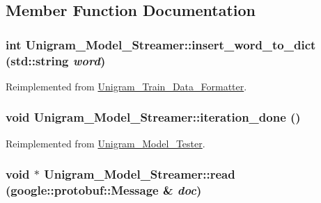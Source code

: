 \subsection{Member Function Documentation}
\hypertarget{class_unigram___model___streamer_a51a09e569da02b64cec4a551cc4f3ba0}{
\subsubsection[{insert\_\-word\_\-to\_\-dict}]{\setlength{\rightskip}{0pt plus 5cm}int Unigram\_\-Model\_\-Streamer::insert\_\-word\_\-to\_\-dict (std::string {\em word})}}
\label{class_unigram___model___streamer_a51a09e569da02b64cec4a551cc4f3ba0}


Reimplemented from \hyperlink{class_unigram___train___data___formatter_a0023886209f7fd1441a256238c86844a}{Unigram\_\-Train\_\-Data\_\-Formatter}.

\hypertarget{class_unigram___model___streamer_a60124013b5da9fabc486558801fa3ab4}{
\subsubsection[{iteration\_\-done}]{\setlength{\rightskip}{0pt plus 5cm}void Unigram\_\-Model\_\-Streamer::iteration\_\-done ()}}
\label{class_unigram___model___streamer_a60124013b5da9fabc486558801fa3ab4}


Reimplemented from \hyperlink{class_unigram___model___tester_a04021ed578bfeaa08a8956fc611c2722}{Unigram\_\-Model\_\-Tester}.

\hypertarget{class_unigram___model___streamer_a8a092c8036f7eb09b76b200fb5524ea0}{
\subsubsection[{read}]{\setlength{\rightskip}{0pt plus 5cm}void $\ast$ Unigram\_\-Model\_\-Streamer::read (google::protobuf::Message \& {\em doc})}}
\label{class_unigram___model___streamer_a8a092c8036f7eb09b76b200fb5524ea0}



